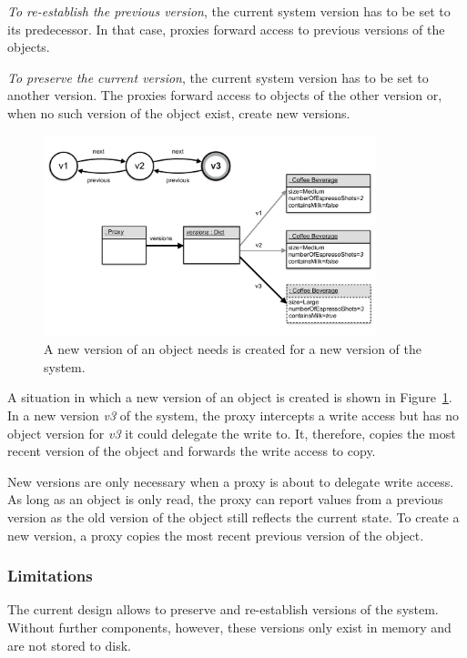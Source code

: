 \emph{To re-establish the previous version}, the current system version has to be set to its predecessor.
In that case, proxies forward access to previous versions of the objects.

\emph{To preserve the current version}, the current system version has to be set to another version.
The proxies forward access to objects of the other version or, when no such version of the object exist, create new versions.

\begin{figure}[h]
    \centering
    \includegraphics[width=0.86\textwidth]{figures/4_approach/10_newVersionOfAnObject.pdf}
    \caption{A new version of an object needs is created for a new version of the system.}
    \label{fig:NewVersion}
\end{figure}

A situation in which a new version of an object is created is shown in Figure~\ref{fig:NewVersion}.
In a new version \emph{v3} of the system, the proxy intercepts a write access but has no object version for \emph{v3} it could delegate the write to.
It, therefore, copies the most recent version of the object and forwards the write access to copy.

New versions are only necessary when a proxy is about to delegate write access.
As long as an object is only read, the proxy can report values from a previous version as the old version of the object still reflects the current state.
To create a new version, a proxy copies the most recent previous version of the object.


\subsubsection{Limitations}

The current design allows to preserve and re-establish versions of the system.
Without further components, however, these versions only exist in memory and are not stored to disk.


